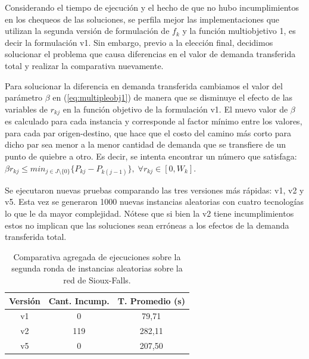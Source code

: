 Considerando el tiempo de ejecución y el hecho de que no hubo incumplimientos en los chequeos de las soluciones, se perfila mejor las implementaciones que utilizan la segunda versión de formulación de $f_k$ y la función multiobjetivo 1, es decir la formulación v1. Sin embargo, previo a la elección final, decidimos solucionar el problema que causa diferencias en el valor de demanda transferida total y realizar la comparativa nuevamente.

Para solucionar la diferencia en demanda transferida cambiamos el valor del parámetro $\beta$ en (\ref{eq:multipleobj1}) de manera que se disminuye el efecto de las variables de $r_{kj}$ en la función objetivo de la formulación v1. El nuevo valor de $\beta$ es calculado para cada instancia y corresponde al factor mínimo entre los valores, para cada par origen-destino, que hace que el costo del camino más corto para dicho par sea menor a la menor cantidad de demanda que se transfiere de un punto de quiebre a otro. Es decir, se intenta encontrar un número que satisfaga: $\beta r_{kj} \leq min_{j \in J \setminus \{0\}} \{ P_{kj} - P_{k(j-1)} \},\; \forall r_{kj} \in [0, W_k]$.

Se ejecutaron nuevas pruebas comparando las tres versiones más rápidas: v1, v2 y v5. Esta vez se generaron 1000 nuevas instancias aleatorias con cuatro tecnologías lo que le da mayor complejidad. Nótese que si bien la v2 tiene incumplimientos estos no implican que las soluciones sean erróneas a los efectos de la demanda transferida total.


\begin{table}[h!]
  \centering
  \begin{tabular}{ccc}
    \toprule
    Versión & Cant. Incump. & T. Promedio (s) \\
    \midrule
    v1 & 0   & 79,71   \\
    v2 & 119 & 282,11  \\
    v5 & 0   & 207,50  \\
    \bottomrule
  \end{tabular}
  \caption{Comparativa agregada de ejecuciones sobre la segunda ronda de instancias aleatorias sobre la red de Sioux-Falls.}\label{table:resumenreejecuciones}
\end{table}

